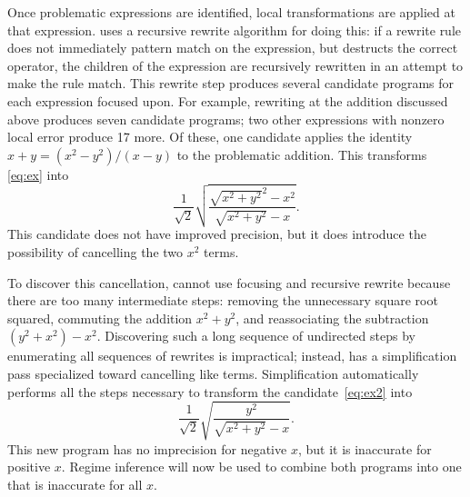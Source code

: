 \documentclass[paper.tex]{subfiles}
\begin{document}
Once problematic expressions are identified,
  local transformations are applied at that expression.
\casio uses a recursive rewrite algorithm for doing this:
  if a rewrite rule does not immediately pattern match on the expression,
  but destructs the correct operator,
  the children of the expression are recursively rewritten
  in an attempt to make the rule match.
This rewrite step produces several candidate programs
  for each expression focused upon.
For example, rewriting at the addition discussed above
  produces seven candidate programs;
  two other expressions with nonzero local error produce 17 more.
Of these, one candidate applies the identity
  $x + y = (x^2 - y^2) / (x - y)$ to the problematic addition.
This transforms \eqref{eq:ex} into
\begin{equation} \label{eq:ex2}
  \frac1{\sqrt2} \sqrt{\frac{\sqrt{x^2 + y^2}^2 - x^2}{\sqrt{x^2 + y^2} - x}}.
\end{equation}
This candidate does not have improved precision,
  but it does introduce the possibility
  of cancelling the two $x^2$ terms.

To discover this cancellation,
  \casio cannot use focusing and recursive rewrite
  because there are too many intermediate steps:
  removing the unnecessary square root squared,
  commuting the addition $x^2 + y^2$,
  and reassociating the subtraction $(y^2 + x^2) - x^2$.
Discovering such a long sequence of undirected steps
  by enumerating all sequences of rewrites
  is impractical;
  instead, \casio has a simplification pass
  specialized toward cancelling like terms.
Simplification automatically performs all the steps necessary
  to transform the candidate~\eqref{eq:ex2} into
\begin{equation} \label{eq:ex3}
  \frac1{\sqrt2} \sqrt{\frac{y^2}{\sqrt{x^2 + y^2} - x}}.
\end{equation}
This new program has no imprecision for negative $x$,
  but it is inaccurate for positive $x$.
Regime inference will now be used to combine both programs
  into one that is inaccurate for all $x$.
\end{document}

